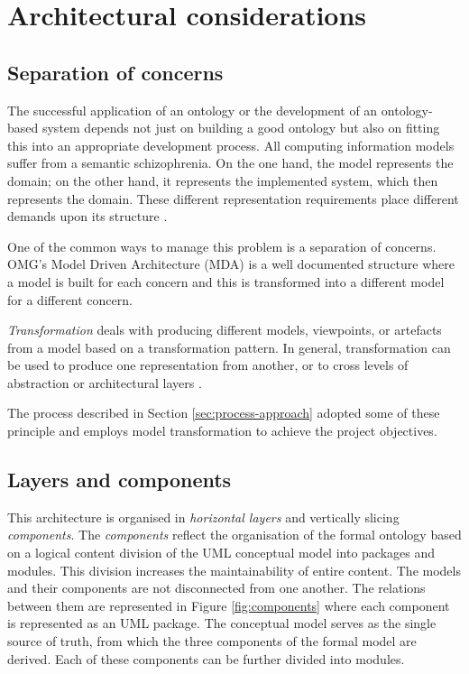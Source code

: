 \section{Architectural considerations}
\label{sec:architecture}

	\subsection{Separation of concerns}
	\label{sec:separation-conceprns}
	
	The successful application of an ontology or the development of an ontology-based system depends not just on building a good ontology but also on fitting this into an appropriate development  process.  All computing information models suffer from a semantic schizophrenia. On the one hand, the model represents the domain; on the other hand, it represents the implemented system, which then represents the domain. These different representation requirements place different demands upon its structure \cite{partridge2013}.
	
	One of the common ways to manage this problem is a separation of concerns. OMG's Model Driven Architecture (MDA) \cite{mda-paper} is a well documented structure where a model is built for each concern and this is transformed into a different model for a different concern. 
	
	\textit{Transformation} deals with producing different models, viewpoints, or artefacts from a model based on a transformation pattern. In general, transformation can be used to produce one representation from another, or to cross levels of abstraction or architectural layers \cite{mda-guide2}. 
	
	The process described in Section \ref{sec:process-approach} adopted some of these principle and employs model transformation to achieve the project objectives.

	
	\subsection{Layers and components}
	\label{sec:layers-components}
	
	This architecture is organised in \textit{horizontal layers} and vertically slicing \textit{components}. The \textit{components} reflect the organisation of the formal ontology based on a logical content division of the UML conceptual model into packages and modules. This division increases the maintainability of entire content. The models and their components are not disconnected from one another. The relations between them are represented in Figure \ref{fig:components} where each component is represented as an UML package. The conceptual model serves as the single source of truth, from which the three components of the formal model are derived. Each of these components can be further divided into modules. 
	
